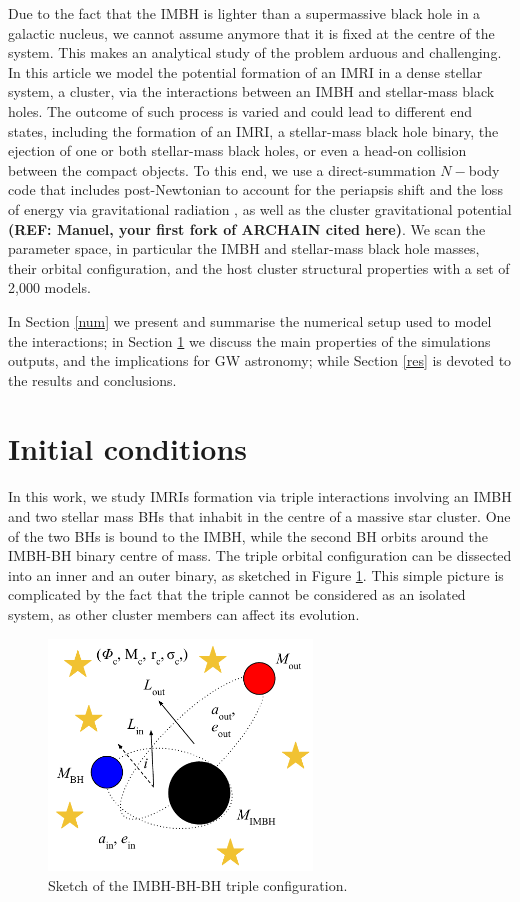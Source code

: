 \documentclass[useAMS,usenatbib]{mn2e}
\begin{document}
Due to the fact that the IMBH is lighter than a supermassive black hole in a
galactic nucleus, we cannot assume anymore that it is fixed at the centre of
the system. This makes an analytical study of the problem arduous and
challenging.  In this article we model the potential formation of an IMRI in a
dense stellar system, a cluster, via the interactions between an IMBH and
stellar-mass black holes. The outcome of such process is varied and could lead
to different end states, including the formation of an IMRI, a stellar-mass
black hole binary, the ejection of one or both stellar-mass black holes, or
even a head-on collision between the compact objects.  To this end, we use a
direct-summation $N-$body code that includes post-Newtonian to account for the
periapsis shift and the loss of energy via gravitational radiation \citep[as
presented for the first time in][]{KupiEtAl06}, as well as the cluster
gravitational potential \textbf{(REF: Manuel, your first fork of ARCHAIN cited
here)}. We scan the parameter space, in particular the IMBH and stellar-mass
black hole masses, their orbital configuration, and the host cluster structural
properties with a set of 2,000 models.

In Section \ref{num} we present and summarise the numerical setup used to model
the interactions; in Section \ref{met} we discuss the main properties of the
simulations outputs, and the implications for GW astronomy; while Section
\ref{res} is devoted to the results and conclusions. 

\section{Initial conditions} \label{met}

In this work, we study IMRIs formation via triple interactions involving an
IMBH and two stellar mass BHs that inhabit in the centre of a massive star
cluster.  One of the two BHs is bound to the IMBH, while the second BH orbits
around the IMBH-BH binary centre of mass. The triple orbital configuration can
be dissected into an inner and an outer binary, as sketched in Figure
\ref{fig:f1}. This simple picture is complicated by the fact that the triple
cannot be considered as an isolated system, as other cluster members can affect
its evolution.

\begin{figure}
    \centering
    \includegraphics[width=7cm]{triple}
    \caption{Sketch of the IMBH-BH-BH triple configuration.}
    \label{fig:f1}
\end{figure}
\end{document}
